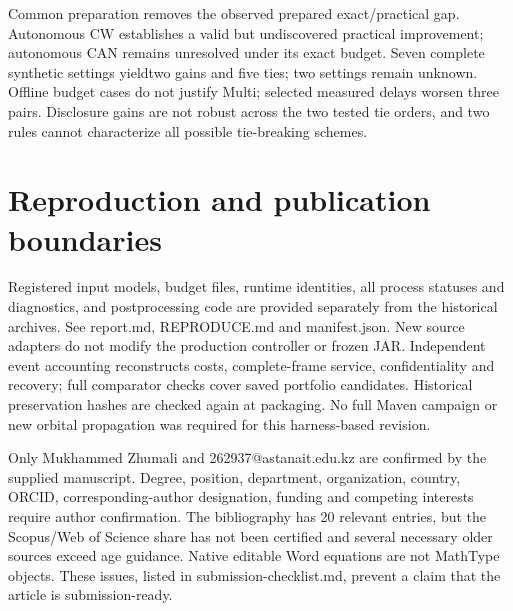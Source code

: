 \documentclass[12pt,a4paper]{article}
\begin{document}
Common preparation removes the observed prepared exact/practical gap. Autonomous CW establishes a valid but undiscovered practical improvement; autonomous CAN remains unresolved under its exact budget. Seven complete synthetic settings yieldtwo gains and five ties; two settings remain unknown. Offline budget cases do not justify Multi; selected measured delays worsen three pairs. Disclosure gains are not robust across the two tested tie orders, and two rules cannot characterize all possible tie-breaking schemes.

\section*{Reproduction and publication boundaries}
Registered input models, budget files, runtime identities, all process statuses and diagnostics, and postprocessing code are provided separately from the historical archives. See report.md, REPRODUCE.md and manifest.json. New source adapters do not modify the production controller or frozen JAR. Independent event accounting reconstructs costs, complete-frame service, confidentiality and recovery; full comparator checks cover saved portfolio candidates. Historical preservation hashes are checked again at packaging. No full Maven campaign or new orbital propagation was required for this harness-based revision.

Only Mukhammed Zhumali and 262937@astanait.edu.kz are confirmed by the supplied manuscript. Degree, position, department, organization, country, ORCID, corresponding-author designation, funding and competing interests require author confirmation. The bibliography has 20 relevant entries, but the Scopus/Web of Science share has not been certified and several necessary older sources exceed age guidance. Native editable Word equations are not MathType objects. These issues, listed in submission-checklist.md, prevent a claim that the article is submission-ready.
\end{document}
